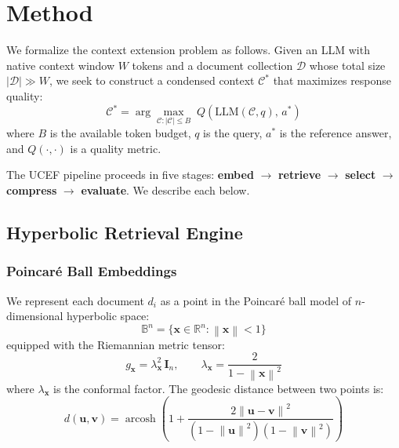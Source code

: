 \documentclass[11pt,a4paper]{article}
\newcommand{\R}{\mathbb{R}}
\newcommand{\B}{\mathbb{B}}
\newcommand{\norm}[1]{\left\|#1\right\|}
\newcommand{\ucef}{\textsf{UCEF}}
\begin{document}
\section{Method}
\label{sec:method}

We formalize the context extension problem as follows.  Given an LLM with
native context window $W$ tokens and a document collection $\mathcal{D}$
whose total size $|\mathcal{D}| \gg W$, we seek to construct a condensed
context $\mathcal{C}^*$ that maximizes response quality:
\begin{equation}
  \mathcal{C}^* = \arg\max_{\mathcal{C}: |\mathcal{C}| \leq B}
  \; Q(\text{LLM}(\mathcal{C}, q),\, a^*)
  \label{eq:objective}
\end{equation}
where $B$ is the available token budget, $q$ is the query, $a^*$ is the
reference answer, and $Q(\cdot, \cdot)$ is a quality metric.

The \ucef{} pipeline proceeds in five stages:
\textbf{embed} $\to$ \textbf{retrieve} $\to$ \textbf{select} $\to$
\textbf{compress} $\to$ \textbf{evaluate}.  We describe each below.

\subsection{Hyperbolic Retrieval Engine}
\label{sec:hyperbolic}

\subsubsection{Poincar\'{e} Ball Embeddings}

We represent each document $d_i$ as a point in the Poincar\'{e} ball model
of $n$-dimensional hyperbolic space:
\begin{equation}
  \B^n = \{\mathbf{x} \in \R^n : \norm{\mathbf{x}} < 1\}
\end{equation}
equipped with the Riemannian metric tensor:
\begin{equation}
  g_{\mathbf{x}} = \lambda_{\mathbf{x}}^2 \, \mathbf{I}_n, \qquad
  \lambda_{\mathbf{x}} = \frac{2}{1 - \norm{\mathbf{x}}^2}
\end{equation}
where $\lambda_{\mathbf{x}}$ is the conformal factor.  The geodesic
distance between two points is:
\begin{equation}
  d(\mathbf{u}, \mathbf{v}) = \operatorname{arcosh}\!\left(
    1 + \frac{2\norm{\mathbf{u} - \mathbf{v}}^2}
            {(1-\norm{\mathbf{u}}^2)(1-\norm{\mathbf{v}}^2)}
  \right)
  \label{eq:poincare-dist}
\end{equation}
\end{document}
